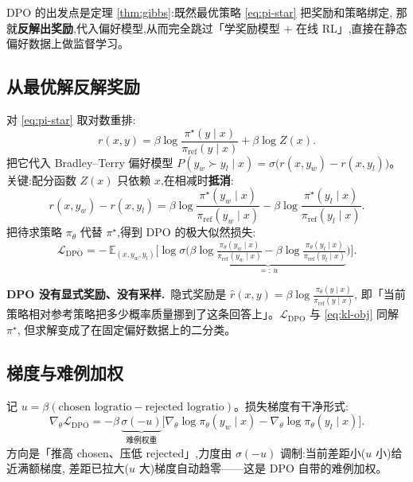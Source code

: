 \documentclass[11pt]{article}
\newcommand{\E}{\mathbb{E}}
\newcommand{\piref}{\pi_{\mathrm{ref}}}
\newcommand{\pith}{\pi_\theta}
\newcommand{\sig}{\sigma}
\theoremstyle{plain}
\theoremstyle{definition}
\theoremstyle{remark}
\begin{document}
DPO 的出发点是定理 \ref{thm:gibbs}:既然最优策略 \eqref{eq:pi-star} 把奖励和策略绑定,
那就\textbf{反解出奖励},代入偏好模型,从而完全跳过「学奖励模型 + 在线 RL」,直接在静态偏好数据上做监督学习。

\subsection{从最优解反解奖励}

对 \eqref{eq:pi-star} 取对数重排:
\begin{equation}\label{eq:dpo-reparam}
r(x,y)=\beta\log\frac{\pi^\star(y\mid x)}{\piref(y\mid x)}+\beta\log Z(x).
\end{equation}
把它代入 Bradley--Terry 偏好模型 $P(y_w\succ y_l\mid x)=\sig\big(r(x,y_w)-r(x,y_l)\big)$。
关键:配分函数 $Z(x)$ 只依赖 $x$,在相减时\textbf{抵消}:
\[
r(x,y_w)-r(x,y_l)=\beta\log\frac{\pi^\star(y_w\mid x)}{\piref(y_w\mid x)}-\beta\log\frac{\pi^\star(y_l\mid x)}{\piref(y_l\mid x)}.
\]
把待求策略 $\pith$ 代替 $\pi^\star$,得到 DPO 的极大似然损失:
\begin{equation}\label{eq:dpo-loss}
\mathcal{L}_{\mathrm{DPO}}=-\,\E_{(x,y_w,y_l)}\Big[\log\sig\big(\underbrace{\beta\log\tfrac{\pith(y_w\mid x)}{\piref(y_w\mid x)}-\beta\log\tfrac{\pith(y_l\mid x)}{\piref(y_l\mid x)}}_{=:\,u}\big)\Big].
\end{equation}

\begin{keybox}
\textbf{DPO 没有显式奖励、没有采样.}\ 隐式奖励是 $\hat r(x,y)=\beta\log\frac{\pith(y\mid x)}{\piref(y\mid x)}$,
即「当前策略相对参考策略把多少概率质量挪到了这条回答上」。$\mathcal{L}_{\mathrm{DPO}}$ 与 \eqref{eq:kl-obj} 同解 $\pi^\star$,
但求解变成了在固定偏好数据上的二分类。
\end{keybox}

\subsection{梯度与难例加权}

记 $u=\beta(\text{chosen logratio}-\text{rejected logratio})$。损失梯度有干净形式:
\begin{equation}\label{eq:dpo-grad}
\nabla_\theta\mathcal{L}_{\mathrm{DPO}}=-\beta\,\underbrace{\sig(-u)}_{\text{难例权重}}\big[\nabla_\theta\log\pith(y_w\mid x)-\nabla_\theta\log\pith(y_l\mid x)\big].
\end{equation}
方向是「推高 chosen、压低 rejected」,力度由 $\sig(-u)$ 调制:当前差距小($u$ 小)给近满额梯度,
差距已拉大($u$ 大)梯度自动趋零——这是 DPO 自带的难例加权。
\end{document}
